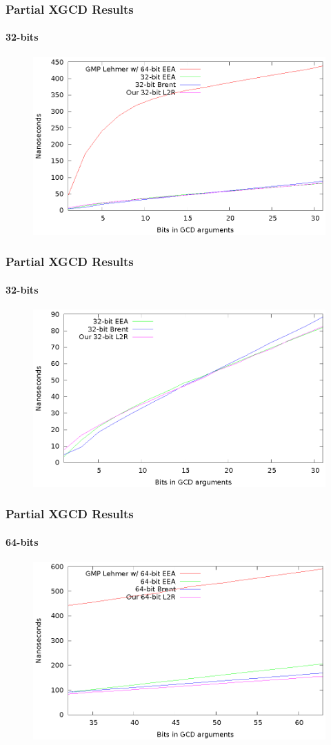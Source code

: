 \documentclass{beamer}
\begin{document}
\begin{frame}
\frametitle{Partial XGCD Results}
\framesubtitle{32-bits}
\begin{figure}
\includegraphics[scale=0.86]{best-partial-32}
\end{figure}
\end{frame}
\begin{frame}
\frametitle{Partial XGCD Results}
\framesubtitle{32-bits}
\begin{figure}
\includegraphics[scale=0.86]{best-partial-32-2}
\end{figure}
\end{frame}
\begin{frame}
\frametitle{Partial XGCD Results}
\framesubtitle{64-bits}
\begin{figure}
\includegraphics[scale=0.86]{best-partial-64}
\end{figure}
\end{frame}
\end{document}
